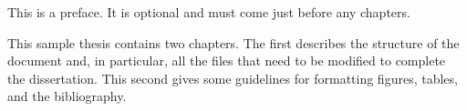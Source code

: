 \preface

This is a preface. It is optional and must come just before any chapters.

This sample thesis contains two chapters. The first describes the structure of the document and, in particular, all the files that need to be modified to complete the dissertation. This second gives some guidelines for formatting figures, tables, and the bibliography.
